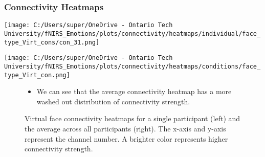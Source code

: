 \documentclass{beamer}
\begin{document}
\begin{frame}
    \frametitle{Connectivity Heatmaps}
    \begin{minipage}[t]{0.45\textwidth}
        \vspace{-\baselineskip}
        \texttt{[image: C:/Users/super/OneDrive - Ontario Tech University/fNIRS\_Emotions/plots/connectivity/heatmaps/individual/face\_type\_Virt\_cons/con\_31.png]}
    \end{minipage}
    \begin{minipage}[t]{0.45\textwidth}
        \vspace{-\baselineskip}
        \texttt{[image: C:/Users/super/OneDrive - Ontario Tech University/fNIRS\_Emotions/plots/connectivity/heatmaps/conditions/face\_type\_Virt\_con.png]}
    \end{minipage}
    \begin{figure}
        \caption{Virtual face connectivity heatmaps for a single participant (left) and the average across all participants (right).
        The x-axis and y-axis represent the channel number. A brighter color represents higher connectivity strength.}
        \begin{itemize}
            \item We can see that the average connectivity heatmap has a more washed out distribution of connectivity strength.
        \end{itemize}
    \end{figure}
\end{frame}
\end{document}
